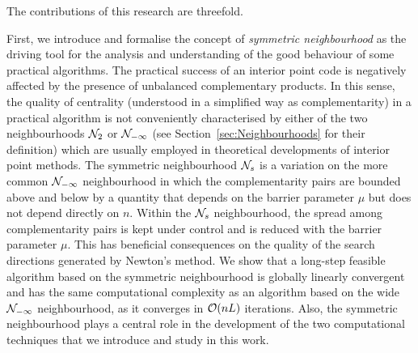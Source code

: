The contributions of this research are threefold.

First, we introduce and formalise the concept of 
{\em symmetric neighbourhood} as the
driving tool for the analysis and understanding of the good behaviour
of some practical algorithms. 
The practical success of an interior point code is negatively
affected by the presence of unbalanced complementary products.
In this sense, 
the quality of centrality (understood in a simplified way 
as complementarity) in a practical algorithm is not 
conveniently characterised by either of the two neighbourhoods 
$\mathcal{N}_2$ or $\mathcal{N}_{-\infty}$ (see Section~\ref{sec:Neighbourhoods}
for their definition) which are usually employed in 
theoretical developments of interior point methods.
The symmetric neighbourhood $\mathcal{N}_s$ is a variation on the more common
$\mathcal{N}_{-\infty}$ neighbourhood in which the complementarity pairs
are bounded above and below by a quantity 
that depends on the barrier parameter $\mu$ but does
not depend directly on $n$.
Within the $\mathcal{N}_s$ neighbourhood, the spread among 
complementarity pairs is kept
under control and is reduced with the barrier parameter $\mu$.
This has beneficial consequences on the quality of the search
directions generated by Newton's method. We show that
a long-step feasible algorithm based on the symmetric neighbourhood
is globally linearly convergent and
has the same computational complexity as an algorithm based
on the wide $\mathcal{N}_{-\infty}$ neighbourhood, as it
converges in $\mathcal{O}(nL)$ iterations.
Also, the symmetric neighbourhood plays a central role in the development 
of the two computational techniques that we introduce and study in this work.

